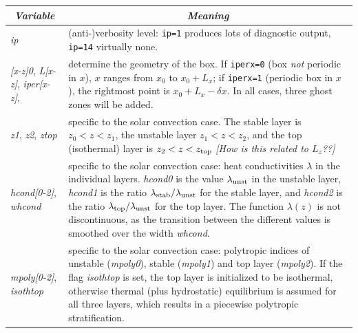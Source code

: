 \documentclass[12pt,twoside,notitlepage,a4paper]{article}
\makeatletter
\newcommand{\Note}[1]{\emph{[#1]}}
\newcommand{\code}[1]{\texttt{#1}}
\newcommand{\var}[1]{\textsl{#1}\index{#1@\emph{#1}}\/}
\makeatother
\begin{document}
\begin{longtable}{lp{}}
\toprule
  \multicolumn{1}{c}{\emph{Variable}}
               & \multicolumn{1}{c}{\emph{Meaning}} \\
\midrule
  \var{ip}     & (anti-)verbosity level: \code{ip=1} produces lots of
                 diagnostic output, \code{ip=14} virtually none. \\
  \var{[x-z]0},
  \var{L[x-z]},
  \var{iper[x-z]},
               & determine the geometry of the box.
                 If \code{iperx=0} (box \emph{not\/} periodic in $x$), $x$
                 ranges from $x_0$ to $x_0+L_x$; if \code{iperx=1}
                 (periodic box in $x$), the rightmost point is
                 $x_0+L_x-\delta x$. In all cases, three ghost zones will
                 be added. \\
  \var{z1}, \var{z2}, \var{ztop}
               & specific to the solar convection case.
                 The stable layer is $z_0 < z < z_1$, the unstable layer
                 $z_1 < z < z_2$, and the top (isothermal) layer is
                 $z_2 < z < z_{\rm top}$
                 \Note{How is this related to $L_z$??} \\
  \var{hcond[0-2]}, \var{whcond}
               & specific to the solar convection case: heat conductivities
                 $\lambda$ in the individual layers. \var{hcond0} is the
                 value $\lambda_{\rm unst}$ in the unstable layer,
                 \var{hcond1} is the ratio
                 $\lambda_{\rm stab}/\lambda_{\rm unst}$ for the stable
                 layer, and \var{hcond2} is the ratio 
                 $\lambda_{\rm top}/\lambda_{\rm unst}$ for the top layer.
                 The function $\lambda(z)$ is not discontinuous, as the
                 transition between the different values is smoothed over
                 the width \var{whcond}. \\
  \var{mpoly[0-2]}, \var{isothtop}
               & specific to the solar convection case: polytropic indices
                 of unstable (\var{mpoly0}), stable (\var{mpoly1}) and top
                 layer (\var{mpoly2}).
                 If the flag \var{isothtop} is set, the
                 top layer is initialized to be isothermal, otherwise
                 thermal (plus hydrostatic) equilibrium is assumed for all
                 three layers, which results in a piecewise polytropic
                 stratification. \\

\end{longtable}
\end{document}
